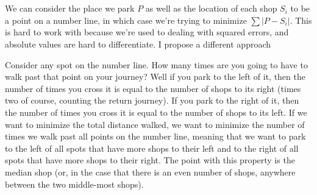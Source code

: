 \documentclass{article}
\begin{document}
\\\\We can consider the place we park $P$ as well as the location of each shop $S_i$ to be a point on a number line, in which case we're trying to minimize $\sum|P - S_i|$. This is hard to work with because we're used to dealing with squared errors, and absolute values are hard to differentiate. I propose a different approach

Consider any spot on the number line. How many times are you going to have to walk past that point on your journey? Well if you park to the left of it, then the number of times you cross it is equal to the number of shops to its right (times two of course, counting the return journey). If you park to the right of it, then the number of times you cross it is equal to the number of shops to its left. If we want to minimize the total distance walked, we want to minimize the number of times we walk past all points on the number line, meaning that we want to park to the left of all spots that have more shops to their left and to the right of all spots that have more shops to their right. The point with this property is the median shop (or, in the case that there is an even number of shops, anywhere between the two middle-most shops).
\end{document}
